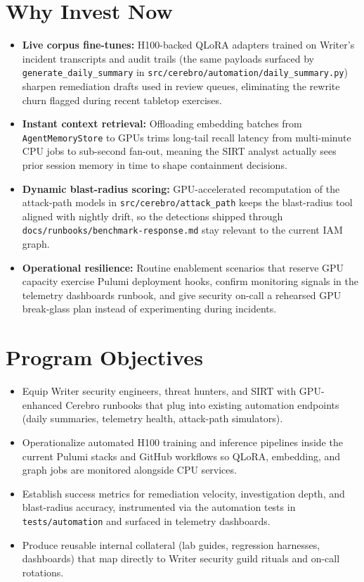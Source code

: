 \documentclass[11pt]{scrartcl}
\begin{document}
\section{Why Invest Now}
\begin{itemize}
  \item \textbf{Live corpus fine-tunes:} H100-backed QLoRA adapters trained on Writer's incident transcripts and audit trails (the same payloads surfaced by \texttt{generate\_daily\_summary} in \texttt{src/cerebro/automation/daily\_summary.py}) sharpen remediation drafts used in review queues, eliminating the rewrite churn flagged during recent tabletop exercises.
  \item \textbf{Instant context retrieval:} Offloading embedding batches from \texttt{AgentMemoryStore} to GPUs trims long-tail recall latency from multi-minute CPU jobs to sub-second fan-out, meaning the SIRT analyst actually sees prior session memory in time to shape containment decisions.
  \item \textbf{Dynamic blast-radius scoring:} GPU-accelerated recomputation of the attack-path models in \texttt{src/cerebro/attack\_path} keeps the blast-radius tool aligned with nightly drift, so the detections shipped through \texttt{docs/runbooks/benchmark-response.md} stay relevant to the current IAM graph.
  \item \textbf{Operational resilience:} Routine enablement scenarios that reserve GPU capacity exercise Pulumi deployment hooks, confirm monitoring signals in the telemetry dashboards runbook, and give security on-call a rehearsed GPU break-glass plan instead of experimenting during incidents.
\end{itemize}

\section{Program Objectives}
\begin{itemize}
  \item Equip Writer security engineers, threat hunters, and SIRT with GPU-enhanced Cerebro runbooks that plug into existing automation endpoints (daily summaries, telemetry health, attack-path simulators).
  \item Operationalize automated H100 training and inference pipelines inside the current Pulumi stacks and GitHub workflows so QLoRA, embedding, and graph jobs are monitored alongside CPU services.
  \item Establish success metrics for remediation velocity, investigation depth, and blast-radius accuracy, instrumented via the automation tests in \texttt{tests/automation} and surfaced in telemetry dashboards.
  \item Produce reusable internal collateral (lab guides, regression harnesses, dashboards) that map directly to Writer security guild rituals and on-call rotations.
\end{itemize}
\end{document}
